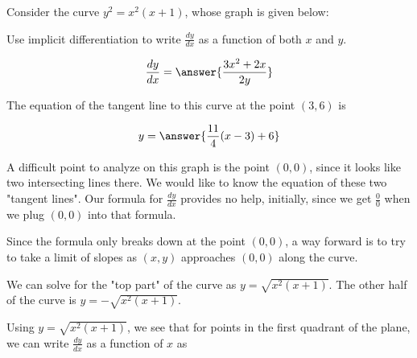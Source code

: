 \documentclass{ximera}
\author{Steven Gubkin}
\begin{document}
\begin{exercise}


Consider the curve  $y^2 = x^2(x+1)$, whose graph is given below:

\begin{image}
\end{image}

Use implicit differentiation to write $\frac{dy}{dx}$ as a function of both $x$ and $y$.

\[
\frac{dy}{dx} = \answer{\frac{3x^2+2x}{2y}}
\]

The equation of the tangent line to this curve at the point $(3,6)$ is

\[
y = \answer{\frac{11}{4}(x-3)+6}
\]

A difficult point to analyze on this graph is the point $(0,0)$, since it looks like two intersecting lines there.  We would like to know the equation of these two "tangent lines".  Our formula for $\frac{dy}{dx}$ provides no help, initially, since we get $\frac{0}{0}$ when we plug $(0,0)$ into that formula.

Since the formula only breaks down at the point $(0,0)$, a way forward is to try to take a limit of slopes as $(x,y)$ approaches $(0,0)$ along the curve.

We can solve for the "top part" of the curve as $y = \sqrt{x^2(x+1)}$.  The other half of the curve is $y  = -\sqrt{x^2(x+1)}$.

Using $y = \sqrt{x^2(x+1)}$, we see that for points in the first quadrant of the plane, we can write $\frac{dy}{dx}$ as a function of $x$ as


\end{exercise}
\end{document}
